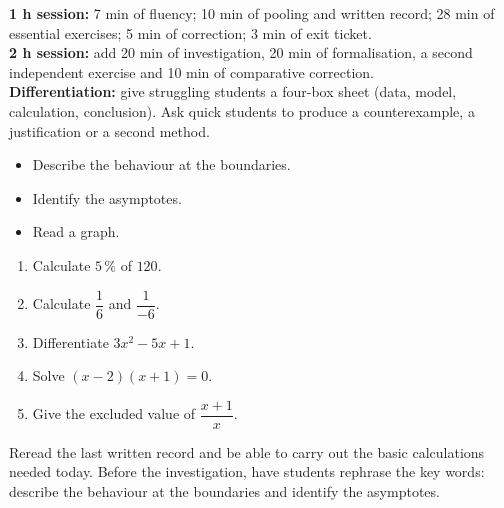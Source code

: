 \ifprof
\begin{methode}
\textbf{1 h session:} 7 min of fluency; 10 min of pooling and written record; 28 min of essential exercises; 5 min of correction; 3 min of exit ticket.\\
\textbf{2 h session:} add 20 min of investigation, 20 min of formalisation, a second independent exercise and 10 min of comparative correction.\\
\textbf{Differentiation:} give struggling students a four-box sheet (data, model, calculation, conclusion). Ask quick students to produce a counterexample, a justification or a second method.
\end{methode}
\fi
{}
\begin{objectifs}\begin{itemize}\item Describe the behaviour at the boundaries.\item Identify the asymptotes.\item Read a graph.\end{itemize}\end{objectifs}
\begin{automatismes}\begin{enumerate}\item Calculate $5\,\%$ of $120$. \item Calculate $\dfrac1{6}$ and $\dfrac1{-6}$. \item Differentiate $3x^2-5x+1$. \item Solve $(x-2)(x+1)=0$. \item Give the excluded value of $\dfrac{x+1}{x}$. \end{enumerate}\end{automatismes}
\begin{prerequis}Reread the last written record and be able to carry out the basic calculations needed today. Before the investigation, have students rephrase the key words: describe the behaviour at the boundaries and identify the asymptotes.\end{prerequis}

